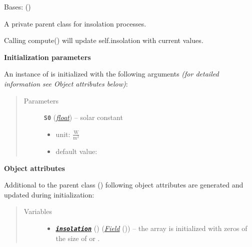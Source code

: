 \documentclass[a4paper,10pt,english]{sphinxmanual}
\begin{document}
\begin{fulllineitems}
\label{api/climlab.radiation:climlab.radiation.insolation._Insolation}
Bases: {\hyperref[api/climlab.process:climlab.process.diagnostic.DiagnosticProcess]{\emph{}}} ()

A private parent class for insolation processes.

Calling compute() will update self.insolation with current values.

\textbf{Initialization parameters}

An instance of  is initialized with the following 
arguments \emph{(for detailed information see Object attributes below)}:
\begin{quote}\begin{description}
\item[{Parameters}] \leavevmode
\textbf{\texttt{S0}} (\href{http://docs.python.org/2.7/library/functions.html\#float}{\emph{float}}) -- 
solar constant
\begin{itemize}
\item {} 
unit: \(\frac{\textrm{W}}{\textrm{m}^2}\)

\item {} 
default value: 

\end{itemize}


\end{description}\end{quote}

\textbf{Object attributes}

Additional to the parent class {\hyperref[api/climlab.process:climlab.process.diagnostic.DiagnosticProcess]{\emph{}}} ()
following object attributes are generated and updated during initialization:
\begin{quote}\begin{description}
\item[{Variables}] \leavevmode\begin{itemize}
\item {} 
{\hyperref[api/climlab.radiation:module\string-climlab.radiation.insolation]{\emph{\textbf{\texttt{insolation}}}}} () ({\hyperref[api/climlab.domain:climlab.domain.field.Field]{\emph{\emph{Field}}}} ()) -- the array is initialized with zeros of the size of
 or .


\end{itemize}
\end{description}
\end{quote}
\end{fulllineitems}
\end{document}
